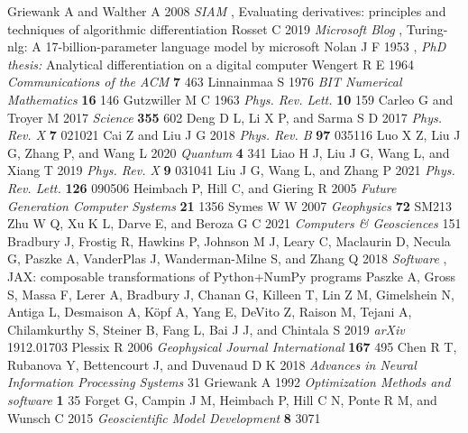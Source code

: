 \documentclass[A4,twoside,UTF8]{ctexart}
\begin{document}
\bigskip

%
%
\begin{thebibliography}{999}
 Griewank A and Walther A 2008 {\it SIAM} , Evaluating derivatives: principles and techniques of algorithmic differentiation
 Rosset C 2019 {\it Microsoft Blog} , Turing-nlg: A 17-billion-parameter language model by microsoft
 Nolan J F 1953 , {\it PhD thesis:} Analytical differentiation on a digital computer
 Wengert R E 1964 {\it Communications of the ACM} {\bf 7} 463
 Linnainmaa S 1976 {\it BIT Numerical Mathematics} {\bf 16} 146
 Gutzwiller M C 1963 {\it Phys. Rev. Lett.} {\bf 10} 159
 Carleo G and Troyer M 2017 {\it Science} {\bf 355} 602
 Deng D L, Li X P, and Sarma S D 2017 {\it Phys. Rev. X} {\bf 7} 021021
 Cai Z and Liu J G 2018 {\it Phys. Rev. B} {\bf 97} 035116
 Luo X Z, Liu J G, Zhang P, and Wang L 2020 {\it Quantum} {\bf 4} 341
 Liao H J, Liu J G, Wang L, and Xiang T 2019 {\it Phys. Rev. X} {\bf 9} 031041
 Liu J G, Wang L, and Zhang P 2021 {\it Phys. Rev. Lett.} {\bf 126} 090506
 Heimbach P, Hill C, and Giering R 2005 {\it Future Generation Computer Systems} {\bf 21} 1356
 Symes W W 2007 {\it Geophysics} {\bf 72} SM213
 Zhu W Q, Xu K L, Darve E, and Beroza G C 2021 {\it Computers \& Geosciences} 151
 Bradbury J, Frostig R, Hawkins P, Johnson M J, Leary C, Maclaurin D, Necula G, Paszke A, VanderPlas J, Wanderman-Milne S, and Zhang Q 2018
{\it Software} , JAX: composable transformations of Python+NumPy programs
 Paszke A, Gross S, Massa F, Lerer A, Bradbury J, Chanan G,
Killeen T, Lin Z M, Gimelshein N, Antiga L, Desmaison A, Köpf A,
Yang E, DeVito Z, Raison M, Tejani A, Chilamkurthy S, Steiner B, Fang L, Bai J J, and Chintala S 2019 {\it arXiv} 1912.01703
 Plessix R 2006 {\it Geophysical Journal International} {\bf 167} 495
 Chen R T, Rubanova Y, Bettencourt J, and Duvenaud D K 2018 {\it Advances in
Neural Information Processing Systems} 31
 Griewank A 1992 {\it Optimization Methods and software} {\bf 1} 35
 Forget G, Campin J M, Heimbach P, Hill C N, Ponte R M, and Wunsch C 2015 {\it Geoscientific Model Development} {\bf 8} 3071

\end{thebibliography}
\end{document}
